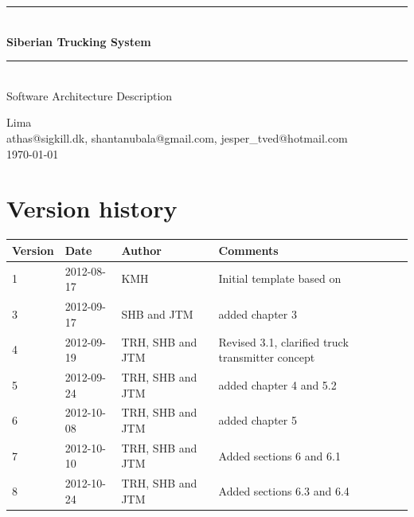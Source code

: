 \documentclass[a4paper,11pt]{report}
\makeatletter
\newcommand{\systemname}{Siberian Trucking System}
\newcommand{\groupname}{Lima}
\newcommand{\contactdetails}{athas@sigkill.dk, shantanubala@gmail.com, jesper\_tved@hotmail.com}
\makeatother
\begin{document}
% 
% 
\newcommand{\HRule}{\rule{\linewidth}{0.5mm}}
\begin{titlepage}

  \begin{center}

    \vspace*{4cm}
    \HRule \\[0.4cm]
    { \huge \bfseries \systemname}\\[0.4cm]
    \HRule \\[1.5cm]

    {\Large Software Architecture Description}

    \vfill
  \end{center}

  \begin{flushleft}
    {\large \groupname}\\[0.2cm]
    {\large \contactdetails}\\[0.2cm]
   {\large \today}
  \end{flushleft}
\end{titlepage}

% 
% 
\newpage
\chapter*{Version history}

\begin{center}
  \begin{tabular}[h!]{| l | l | l | p{8 cm} |}
    \hline
    \rowcolor{gray}
    Version & Date & Author & Comments \\
    \hline
    \hline
    1 & 2012-08-17 & KMH & Initial template based on
    \citep{rozanski2011software} \\
    \hline
    3 & 2012-09-17 & SHB and JTM & added chapter 3\\
    \hline
    4 & 2012-09-19 & TRH, SHB and JTM & Revised 3.1, clarified truck transmitter concept \\
    \hline
    5 & 2012-09-24 & TRH, SHB and JTM & added chapter 4 and 5.2\\
    \hline
    6 & 2012-10-08 & TRH, SHB and JTM & added chapter 5 \\
    \hline
    7 & 2012-10-10 & TRH, SHB and JTM & Added sections 6 and 6.1\\
    \hline
    8 & 2012-10-24 & TRH, SHB and JTM & Added sections 6.3 and 6.4\\
   \hline
  \end{tabular}
\end{center}
\end{document}
